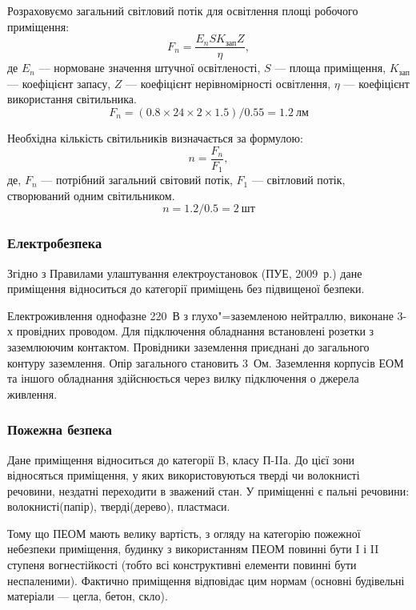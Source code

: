 \documentclass[simple,14pt,utf8,ukrainian]{eskdtext}
\begin{document}
      Розраховуємо загальний світловий потік для освітлення площі робочого
      приміщення:
      \begin{equation}
        F_{n} = \frac{E_n S K_\text{зап} Z}{\eta},
        \label{eq:f-n}
      \end{equation}
      де $E_n$ --- нормоване значення штучної освітленості, $S$ --- площа
      приміщення, $K_\text{зап}$ --- коефіцієнт запасу, $Z$ --- коефіцієнт
      нерівномірності освітлення, $\eta$ --- коефіцієнт використання
      світильника.
      \[ F_{n} = (0.8 \times 24 \times 2 \times 1.5) / 0.55 = 1.2~\text{лм} \]

      Необхідна кількість світильників визначається за формулою:
      \begin{equation}
        n = \frac{F_n}{F_1},
        \label{eq:n}
      \end{equation}
      де, $F_n$ --- потрібний загальний світовий потік, $F_1$ --- світловий
      потік, створюваний одним світильником.
      \[ n = 1.2 / 0.5 = 2~\text{шт} \]
    \subsubsection{Електробезпека}
      Згідно з Правилами улаштування електроустановок (ПУЕ, 2009~р.) дане
      приміщення відноситься до категорії приміщень без підвищеної безпеки.

      Електроживлення однофазне \num{220}~В з глухо"=заземленою нейтраллю,
      виконане 3-х провідних проводом.
      Для підключення обладнання встановлені розетки з заземлюючим контактом.
      Провідники заземлення приєднані до загального контуру заземлення.
      Опір загального становить \num{3}~Ом.
      Заземлення корпусів ЕОМ та іншого обладнання здійснюється через вилку
      підключення о джерела живлення.
    \subsubsection{Пожежна безпека}
      Дане приміщення відноситься до категорії B, класу П-IIа.
      До цієї зони відносяться приміщення, у яких використовуються тверді чи
      волокнисті речовини, нездатні переходити в зважений стан\cite{napb}.
      У приміщенні є пальні речовини: волокнисті(папір), тверді(дерево),
      пластмаси.

      Тому що ПЕОМ мають велику вартість, з огляду на категорію пожежної
      небезпеки приміщення, будинку з використанням ПЕОМ повинні бути I і II
      ступеня вогнестійкості (тобто всі конструктивні елементи повинні бути
      неспаленими).
      Фактично приміщення відповідає цим нормам (основні будівельні матеріали
      --- цегла, бетон, скло).
\end{document}
